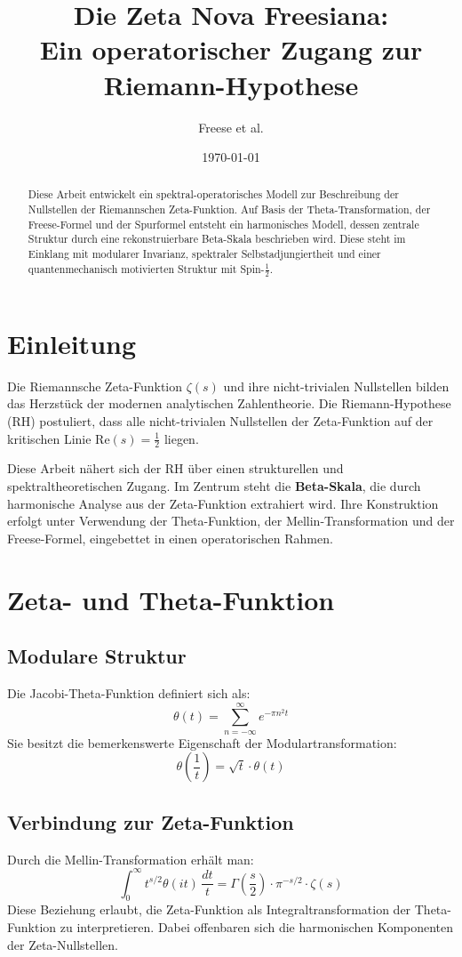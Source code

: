 \documentclass[12pt]{article}
\title{\textbf{Die Zeta Nova Freesiana: \\Ein operatorischer Zugang zur Riemann-Hypothese}}
\author{Freese et al.}
\date{\today}
\begin{document}
\maketitle

\begin{abstract}
Diese Arbeit entwickelt ein spektral-operatorisches Modell zur Beschreibung der Nullstellen der Riemannschen Zeta-Funktion. Auf Basis der Theta-Transformation, der Freese-Formel und der Spurformel entsteht ein harmonisches Modell, dessen zentrale Struktur durch eine rekonstruierbare Beta-Skala beschrieben wird. Diese steht im Einklang mit modularer Invarianz, spektraler Selbstadjungiertheit und einer quantenmechanisch motivierten Struktur mit Spin-$\tfrac{1}{2}$.
\end{abstract}


\section{Einleitung}
Die Riemannsche Zeta-Funktion \(\zeta(s)\) und ihre nicht-trivialen Nullstellen bilden das Herzstück der modernen analytischen Zahlentheorie. Die Riemann-Hypothese (RH) postuliert, dass alle nicht-trivialen Nullstellen der Zeta-Funktion auf der kritischen Linie \(\text{Re}(s) = \tfrac{1}{2}\) liegen.

Diese Arbeit nähert sich der RH über einen strukturellen und spektraltheoretischen Zugang. Im Zentrum steht die \textbf{Beta-Skala}, die durch harmonische Analyse aus der Zeta-Funktion extrahiert wird. Ihre Konstruktion erfolgt unter Verwendung der Theta-Funktion, der Mellin-Transformation und der Freese-Formel, eingebettet in einen operatorischen Rahmen.

\section{Zeta- und Theta-Funktion}

\subsection{Modulare Struktur}
Die Jacobi-Theta-Funktion definiert sich als:
\[
\theta(t) = \sum_{n=-\infty}^{\infty} e^{-\pi n^2 t}
\]
Sie besitzt die bemerkenswerte Eigenschaft der Modulartransformation:
\[
\theta\left(\frac{1}{t}\right) = \sqrt{t} \cdot \theta(t)
\]

\subsection{Verbindung zur Zeta-Funktion}
Durch die Mellin-Transformation erhält man:
\[
\int_0^\infty t^{s/2} \theta(it) \, \frac{dt}{t} = \Gamma\left( \frac{s}{2} \right) \cdot \pi^{-s/2} \cdot \zeta(s)
\]
Diese Beziehung erlaubt, die Zeta-Funktion als Integraltransformation der Theta-Funktion zu interpretieren. Dabei offenbaren sich die harmonischen Komponenten der Zeta-Nullstellen.
\end{document}
